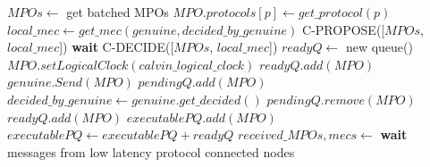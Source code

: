 \documentclass[a4paper, 10pt]{article}
\begin{document}
\begin{algorithmic}[1]
        \State $MPOs\gets$ get batched MPOs \label{alg:line:init}
                \State $MPO.protocols[p]\gets get\_protocol(p)$
            \EndFor
        \EndFor \label{alg:line:init:end}
        \State $local\_mec\gets get\_mec(genuine, decided\_by\_genuine)$
        \State
        \State C-PROPOSE([$MPOs$, $local\_mec$]) \label{alg:line:replication}
        \State \textbf{wait} C-DECIDE([$MPOs$, $local\_mec$]) \label{alg:line:replication:end}
        \State
        \State $readyQ \gets$ new queue()
                \State $MPO.setLogicalClock(calvin\_logical\_clock)$ \label{alg:line:clock_assign_calvin}
                \State $readyQ.add(MPO)$ \label{alg:line:clock_assign_calvin:end}
            \Else
                \State $genuine.Send(MPO)$\label{alg:line:genuine_dispatch}
                \State $pendingQ.add(MPO)$\label{alg:line:genuine_dispatch:end}
            \EndIf
        \EndFor
        \State
        \State $decided\_by\_genuine\gets genuine.get\_decided()$ \label{alg:line:clock_assign_genuine}
                \State $pendingQ.remove(MPO)$
                \State $readyQ.add(MPO)$
            \Else
                \State $executablePQ.add(MPO)$
            \EndIf
        \EndFor \label{alg:line:get_multicast:end}
        \State
         \label{alg:line:calvin_dispatch}
        \State $executablePQ \gets executablePQ + readyQ$
        \State $received\_MPOs, mecs \gets$ \textbf{wait} messages from low latency protocol connected nodes \label{alg:line:calvin_dispatch:end}

\end{algorithmic}
\end{document}
